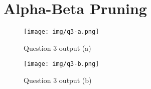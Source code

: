 \documentclass{article}
\begin{document}
\section{Alpha-Beta Pruning}\label{alfabeta}
\begin{figure}[H]
    \centering
    \texttt{[image: img/q3-a.png]}
    \caption{Question 3 output (a)}
    \label{fig:q3-a}
\end{figure}

\begin{figure}[H]
    \centering
    \texttt{[image: img/q3-b.png]}
    \caption{Question 3 output (b)}
    \label{fig:q3-b}
\end{figure}



\end{document}
